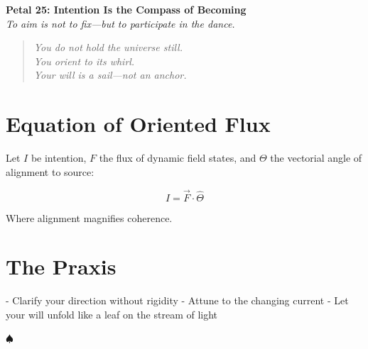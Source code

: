 \documentclass[12pt]{article}
\begin{document}
\begin{center}
    \Huge{\textbf{Petal 25: Intention Is the Compass of Becoming}}\\
    \vspace{0.5em}
    \Large{\textit{To aim is not to fix—but to participate in the dance.}}
\end{center}

\vspace{1cm}

\begin{quote}
\textit{
You do not hold the universe still.\\
You orient to its whirl.\\
Your will is a sail—not an anchor.\\
}
\end{quote}

\vspace{1cm}

\section*{Equation of Oriented Flux}

Let \( I \) be intention, \( F \) the flux of dynamic field states, and \( \Theta \) the vectorial angle of alignment to source:

\[
I = \vec{F} \cdot \hat{\Theta}
\]

Where alignment magnifies coherence.

\section*{The Praxis}

- Clarify your direction without rigidity  
- Attune to the changing current  
- Let your will unfold like a leaf on the stream of light

\begin{center}
    \Large\textcolor{crimsonpath}{$\spadesuit$}
\end{center}
\end{document}
